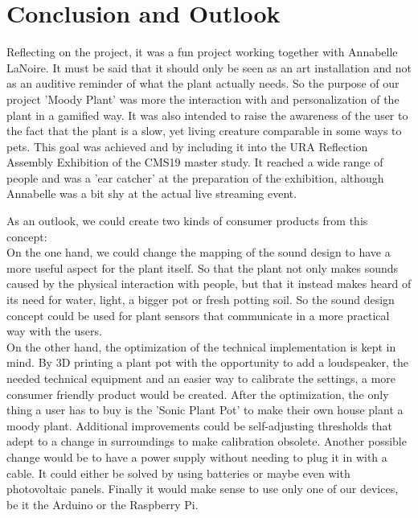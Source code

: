 \section{Conclusion and Outlook}

Reflecting on the project, it was a fun project working together with Annabelle LaNoire. It must be said that it should only be seen as an art installation and not as an auditive reminder of what the plant actually needs.  So the purpose of our project 'Moody Plant' was more the interaction with and personalization of the plant in a gamified way. It was also intended to raise the awareness of the user to the fact that the plant is a slow, yet living creature comparable in some ways to pets. 
This goal was achieved and by including it into the URA Reflection Assembly Exhibition of the CMS19 master study. It reached a wide range of people and was a 'ear catcher' at the preparation of the exhibition, although Annabelle was a bit shy at the actual live streaming event. 

As an outlook, we could create two kinds of consumer products from this concept: \\
On the one hand, we could change the mapping of the sound design to have a more useful aspect for the plant itself. So that the plant not only makes sounds caused by the physical interaction with people, but that it instead makes heard of its need for water, light, a bigger pot or fresh potting soil. So the sound design concept could be used for plant sensors that communicate in a more practical way with the users.   \\
On the other hand, the optimization of the technical implementation is kept in mind. By 3D printing a plant pot with the opportunity to add a loudspeaker, the needed technical equipment and an easier way to calibrate the settings, a more consumer friendly product would be created. After the optimization, the only thing a user has to buy is the 'Sonic Plant Pot' to make their own house plant a moody plant. Additional improvements could be self-adjusting thresholds that adept to a change in surroundings to make calibration obsolete. Another possible change would be to have a power supply without needing to plug it in with a cable. It could either be solved by using batteries or maybe even with photovoltaic panels. Finally it would make sense to use only one of our devices, be it the Arduino or the Raspberry Pi.
